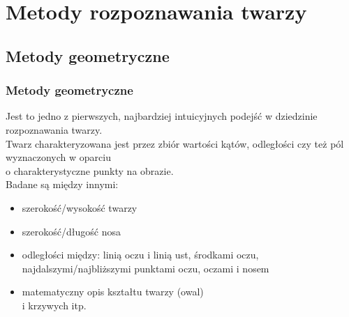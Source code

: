 \documentclass[xcolor=table]{beamer}
\begin{document}
\section{Metody rozpoznawania twarzy}

\subsection{Metody geometryczne}
\begin{frame}
  \frametitle{Metody geometryczne}

Jest to jedno z pierwszych, najbardziej intuicyjnych podejść w dziedzinie rozpoznawania twarzy. \\
Twarz charakteryzowana jest przez zbiór wartości kątów, odległości czy też pól wyznaczonych w oparciu \\
o charakterystyczne punkty na obrazie. \\
Badane są między innymi:
\begin{itemize}
\item szerokość/wysokość twarzy
\item szerokość/długość nosa
\item odległości między: linią oczu i linią ust, środkami oczu, najdalszymi/najbliższymi punktami oczu, oczami i nosem
\item matematyczny opis kształtu twarzy (owal) \\i krzywych itp.
\end{itemize}
\end{frame}

\end{document}
